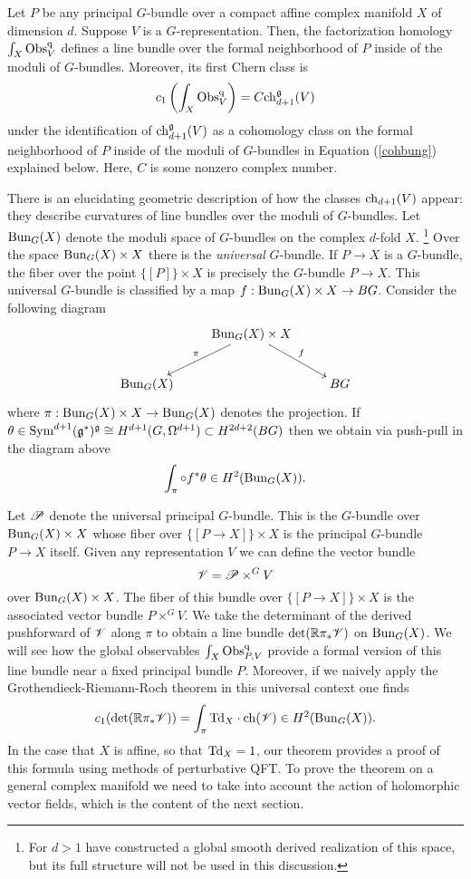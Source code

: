 \documentclass[10pt]{amsart}
\begin{document}
\begin{thm}\label{thm ggrr}
Let $P$ be any principal $G$-bundle over a compact affine complex manifold $X$ of dimension $d$.
Suppose   $V$ is a $G$-representation.
Then, the factorization homology $\int_X {\rm Obs}^{\rm q}_{V}$ defines a line bundle over the formal neighborhood of $P$ inside of the moduli of $G$-bundles.
Moreover, its first Chern class is 
\[
c_1\left(\int_X {\rm Obs}^{\rm q}_{V}\right) = C {\rm ch}_{d+1}^\mathfrak g (V)
\]
under the identification of ${\rm ch}_{d+1}^{\mathfrak g} (V)$ as a cohomology class on the formal neighborhood of $P$ inside of the moduli of $G$-bundles in Equation (\ref{cohbung}) explained below.
Here, $C$ is some nonzero complex number.
\end{thm}

There is an elucidating geometric description of how the classes ${\rm ch}_{d+1}(V)$ appear: they describe curvatures of line bundles over the moduli of $G$-bundles.
Let ${\rm Bun}_{G}(X)$ denote the moduli space of $G$-bundles on the complex $d$-fold $X$. \footnote{For $d > 1$ \cite{FHK} have constructed a global smooth derived realization of this space, but its full structure will not be used in this discussion.}
Over the space ${\rm Bun}_G(X) \times X$ there is the {\em universal} $G$-bundle. 
If $P \to X$ is a $G$-bundle, the fiber over the point $\{[P]\} \times X$ is precisely the $G$-bundle $P \to X$. 
This universal $G$-bundle is classified by a map $f : {\rm Bun}_G(X) \times X \to B G$. 
Consider the following diagram
\[
\xymatrix{
& {\rm Bun}_G(X) \times X \ar[dr]^-{f} \ar[dl]_-{\pi} & \\
{\rm Bun}_G(X) & & B G
}
\]
where $\pi : {\rm Bun}_G(X) \times X \to {\rm Bun}_G(X)$ denotes the projection. 
If $\theta \in {\rm Sym}^{d+1}(\mathfrak g^*)^\mathfrak g \cong H^{d+1}(G , \Omega^{d+1}) \subset H^{2d+2}(BG)$ then we obtain via push-pull in the diagram above
\[
\int_\pi \circ f^* \theta \in H^2({\rm Bun}_G(X)) .
\] 

Let $\mathscr P$ denote the universal principal $G$-bundle.
This is the $G$-bundle over ${\rm Bun}_G(X) \times X$ whose fiber over $\{[P\to X]\} \times X$ is the principal $G$-bundle $P \to X$ itself. 
Given any representation $V$ we can define the vector bundle
\[
\mathscr V = \mathscr P \times^G V
\]
over ${\rm Bun}_G(X) \times X$.
The fiber of this bundle over $\{[P\to X]\} \times X$ is the associated vector bundle $P \times^G V$. 
We take the determinant of the derived pushforward of $\mathscr V$ along $\pi$ to obtain a line bundle $\det(\mathbb R \pi_* \mathscr V)$ on ${\rm Bun}_G(X)$. 
We will see how the global observables $\int_X {\rm Obs}^{\rm q}_{P,V}$ provide a formal version of this line bundle near a fixed principal bundle $P$. 
Moreover, if we naively apply the Grothendieck-Riemann-Roch theorem in this universal context one finds
\[
c_1(\det(\mathbb R \pi_* \mathscr V)) = \int_\pi {\rm Td}_X \cdot {\rm ch}(\mathscr V) \in H^2({\rm Bun}_G(X)) .
\]
In the case that $X$ is affine, so that ${\rm Td}_X = 1$, our theorem provides a proof of this formula using methods of perturbative QFT. 
To prove the theorem on a general complex manifold we need to take into account the action of holomorphic vector fields, which is the content of the next section.
\end{document}
